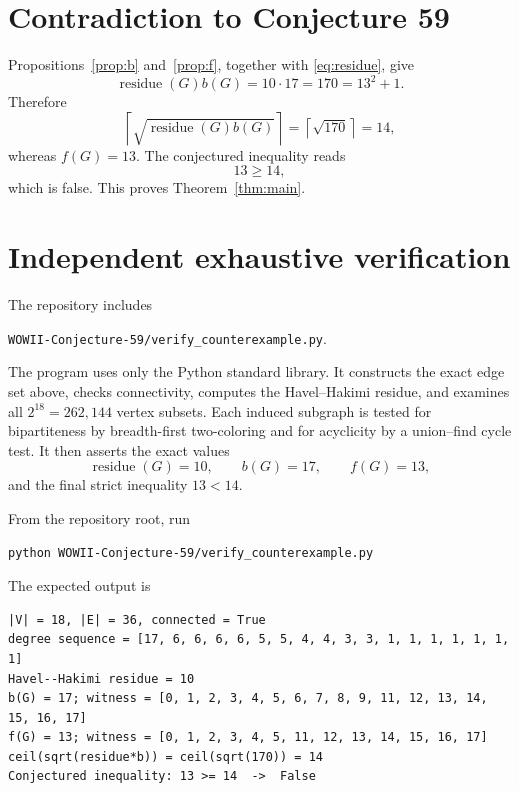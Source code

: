 \documentclass[11pt]{article}
\newcommand{\res}{\operatorname{residue}}
\newcommand{\ceil}[1]{\left\lceil #1 \right\rceil}
\begin{document}
\section{Contradiction to Conjecture 59}

Propositions~\ref{prop:b} and~\ref{prop:f}, together with
\eqref{eq:residue}, give
\[
 \res(G)b(G)=10\cdot17=170=13^2+1.
\]
Therefore
\[
 \ceil{\sqrt{\res(G)b(G)}}=\ceil{\sqrt{170}}=14,
\]
whereas $f(G)=13$. The conjectured inequality reads
\[
 13\ge14,
\]
which is false. This proves Theorem~\ref{thm:main}.

\begin{center}
\setlength{\fboxsep}{10pt}
\color{resultgreen}
\end{center}

\section{Independent exhaustive verification}

The repository includes
\begin{center}
\texttt{WOWII-Conjecture-59/verify\_counterexample.py}.
\end{center}
The program uses only the Python standard library. It constructs the exact
edge set above, checks connectivity, computes the Havel--Hakimi residue, and
examines all $2^{18}=262{,}144$ vertex subsets. Each induced subgraph is tested
for bipartiteness by breadth-first two-coloring and for acyclicity by a
union--find cycle test. It then asserts the exact values
\[
 \res(G)=10,\qquad b(G)=17,\qquad f(G)=13,
\]
and the final strict inequality $13<14$.

From the repository root, run
\begin{verbatim}
python WOWII-Conjecture-59/verify_counterexample.py
\end{verbatim}
The expected output is
\begin{verbatim}
|V| = 18, |E| = 36, connected = True
degree sequence = [17, 6, 6, 6, 6, 5, 5, 4, 4, 3, 3, 1, 1, 1, 1, 1, 1, 1]
Havel--Hakimi residue = 10
b(G) = 17; witness = [0, 1, 2, 3, 4, 5, 6, 7, 8, 9, 11, 12, 13, 14, 15, 16, 17]
f(G) = 13; witness = [0, 1, 2, 3, 4, 5, 11, 12, 13, 14, 15, 16, 17]
ceil(sqrt(residue*b)) = ceil(sqrt(170)) = 14
Conjectured inequality: 13 >= 14  ->  False
\end{verbatim}
\end{document}
